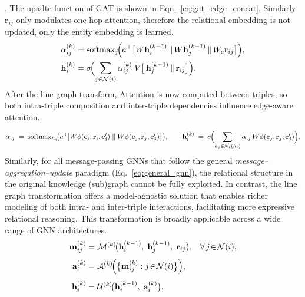 . The upadte function of GAT is shown in Eqn.~\ref{eq:gat_edge_concat}. Similarly $\mathbf r_{ij}$ only modulates one-hop attention, therefore the relational embedding is not updated, only the entity embedding is learned. 
\begin{align}\label{eq:gat_edge_concat}
  \alpha_{ij}^{(k)}
    &= \mathrm{softmax}_{j}\!
       \Bigl(
         a^\top
         \bigl[
           W \mathbf h_i^{(k-1)} \,\Vert\,
           W \mathbf h_j^{(k-1)} \,\Vert\,
           W_e \mathbf r_{ij}
         \bigr]
       \Bigr), \nonumber\\
  \mathbf h_i^{(k)}
    &= \sigma\!\Bigl(
        \sum_{j\in\mathcal N(i)}
          \alpha_{ij}^{(k)}\;
          V\bigl[\,
            \mathbf h_j^{(k-1)} \,\Vert\, \mathbf r_{ij}
          \bigr]
      \Bigr).
\end{align}
After the line-graph transform, Attention is now computed between triples, so both intra-triple composition and inter-triple dependencies influence edge-aware attention.

\begin{equation}
  \alpha_{ij}
  \;=\;
  \operatorname{softmax}_{h_j}
  \!\bigl(
    a^\top\!
    \bigl[
      W\phi(\mathbf e_i,\mathbf r_i,\mathbf e_i')
      \;\Vert\;
      W\phi(\mathbf e_j,\mathbf r_j,\mathbf e_j')
    \bigr]
  \bigr),
  \qquad
  {\mathbf{h}}_{i}^{(k)}
  \;=\;
  \sigma\!\Bigl(
    \sum_{h_j\in\mathcal N_\ell(h_i)}
      \alpha_{ij}\,
      W\phi(\mathbf e_j,\mathbf r_j,\mathbf e_j')
  \Bigr).
\end{equation}
Similarly, for all message-passing GNNs that follow the general \textit{message–aggregation–update} paradigm (Eq.~\ref{eq:general_gnn}), the relational structure in the original knowledge (sub)graph cannot be fully exploited. In contrast, the line graph transformation offers a model-agnostic solution that enables richer modeling of both intra- and inter-triple interactions, facilitating more expressive relational reasoning. This transformation is broadly applicable across a wide range of GNN architectures.
\begin{equation}
\begin{aligned}
\label{eq:general_gnn}
\mathbf m_{ij}^{(k)}
  &= \mathcal M^{(k)}
     \!\bigl(
       \mathbf h_i^{(k-1)},\;
       \mathbf h_j^{(k-1)},\;
       \mathbf r_{ij}
     \bigr),
     &&\forall\, j\!\in\!\mathcal N(i),
\\[4pt]
\mathbf a_i^{(k)}
  &= \mathcal A^{(k)}
     \!\Bigl(
       \bigl\{\mathbf m_{ij}^{(k)} : j\!\in\!\mathcal N(i)\bigr\}
     \Bigr),
\\[4pt]
\mathbf h_i^{(k)}
  &= \mathcal U^{(k)}
     \!\bigl(
       \mathbf h_i^{(k-1)},\;
       \mathbf a_i^{(k)}
     \bigr),
\end{aligned}
\end{equation}


